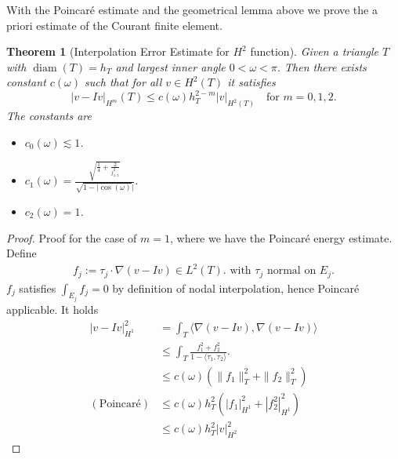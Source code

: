 \documentclass[a4paper,12pt,oneside,fleqn]{book}
\newtheorem{theorem}{Theorem}[section]
\theoremstyle{definition}
\theoremstyle{remark}
\DeclareMathOperator*{\diam}{diam}
\begin{document}
With the Poincar\'e estimate and the geometrical lemma above we prove the a priori estimate of the Courant finite element.
\begin{theorem}[Interpolation Error Estimate for $H^2$ function]
	Given a triangle $T$ with $\diam(T) = h_T$ and largest inner angle $ 0 < \omega < \pi$. Then there exists constant $c(\omega)$ such that for all $v \in H^2(T)$ it satisfies 
	\begin{equation}
		|v - Iv|_{H^m}(T) \le c(\omega) h_T^{2 - m} |v|_{H^2(T)} \quad\text{for }m = 0, 1, 2.
	\end{equation}
	The constants are
	\begin{itemize}
		\item $c_0(\omega) \lesssim 1$.
		\item $c_1(\omega) = \frac{\sqrt{\frac{1}{4} + \frac{2}{j_{1, 1}^2}}}{\sqrt{1 - |\cos(\omega)}|}$.
		\item $c_2(\omega) = 1$. 
	\end{itemize}
\end{theorem}
\begin{proof}
	Proof for the case of $m = 1$, where we have the Poincar\'e energy estimate. Define
	\begin{align*}
		f_j:= \tau_j  \cdot \nabla (v - Iv) \in L^2(T). \text{ with } \tau_j \text{ normal on $E_j$.} 
	\end{align*}
	$f_j$ satisfies $\int_{E_j} f_j = 0$ by definition of nodal interpolation, hence Poincar\'e applicable. It holds
	\begin{align*}
		| v - Iv |_{H^1}^2 &= \int_T \langle \nabla (v - I v), \nabla (v - Iv) \rangle\\
		& \le \int_T \frac{f_1^2 + f_2^2  }{1 - \langle \tau_1, \tau_2 \rangle}.\\
		& \le  c(\omega) ( \|f_1\|^2_T + \|f_2\|_T^2 )\\
		(\text{Poincar\'e})
		& \le c(\omega) h_T^2 (|f_1|_{H^1}^2 + |f_2^2|^2_{H^1})\\
		& \le c(\omega)h_T^2 |v|_{H^2}^2 
	\end{align*}
\end{proof}
\end{document}
